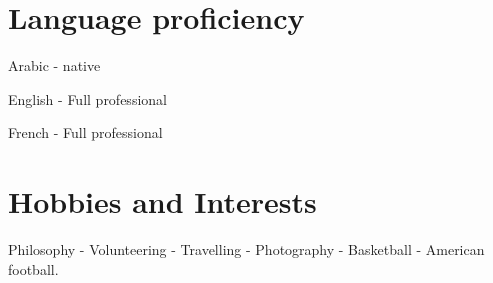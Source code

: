 \documentclass[a4paper,20pt]{article}
\begin{document}
\section{Language proficiency}
\begin{description}[font=$\bullet$]
\item {Arabic - native}
\vspace{-5pt}
\item {English - Full professional}
\vspace{-5pt}
\item {French - Full professional}
\end{description}
\section{Hobbies and Interests}
\begin{description}[font=$\bullet$]
\item Philosophy - Volunteering - Travelling - Photography - Basketball  - American football. 
\end{description}
\end{document}
